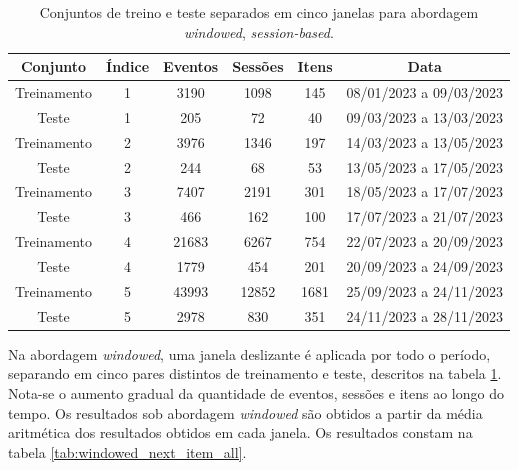 \begin{table}[htbp]
  \centering
  \begin{tabular}{|c|c|c|c|c|c|}
    \hline
    Conjunto & Índice & Eventos & Sessões & Itens & Data\\
    \hline
    Treinamento & 1 & 3190 & 1098 & 145 & 08/01/2023 a 09/03/2023\\
    \hline
    Teste & 1 & 205 & 72 & 40 & 09/03/2023 a 13/03/2023\\
    \hline
    Treinamento & 2 & 3976 & 1346 & 197 & 14/03/2023 a 13/05/2023\\
    \hline
    Teste & 2 & 244 & 68 & 53 & 13/05/2023 a 17/05/2023\\
    \hline
    Treinamento & 3 & 7407 & 2191 & 301 & 18/05/2023 a 17/07/2023\\
    \hline
    Teste & 3 & 466 & 162 & 100 & 17/07/2023 a 21/07/2023\\
    \hline
    Treinamento & 4 & 21683 & 6267 & 754 & 22/07/2023 a 20/09/2023\\
    \hline
    Teste & 4 & 1779 & 454 & 201 & 20/09/2023 a 24/09/2023\\
    \hline
    Treinamento & 5 & 43993 & 12852 & 1681 & 25/09/2023 a 24/11/2023\\
    \hline
    Teste & 5 & 2978 & 830 & 351 & 24/11/2023 a 28/11/2023\\
    \hline
  \end{tabular}
  \caption{Conjuntos de treino e teste separados em cinco janelas para abordagem \textit{windowed}, \textit{session-based}.}
  \label{tab:windowed_data}
\end{table}

Na abordagem
\textit{windowed}, uma janela deslizante é aplicada por todo o período,
separando em cinco pares distintos de treinamento e teste, descritos na tabela
\ref{tab:windowed_data}. Nota-se o aumento gradual da quantidade de eventos,
sessões e itens ao longo do tempo. Os resultados sob abordagem \textit{windowed} são obtidos a partir da média
aritmética dos resultados obtidos em cada janela. Os resultados constam na
tabela \ref{tab:windowed_next_item_all}.


